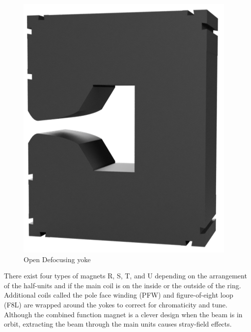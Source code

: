 \documentclass[a4paper,
               biblatex,     %
               keeplastbox,   %
               ]{jacow}
\begin{document}
\begin{figure}[!htb]
\begin{minipage}[b]{0.45\columnwidth}
    \includegraphics*[width=\textwidth]{defocusing}
    \caption{Open Defocusing yoke}
    \label{fig:defocusing}
  \end{minipage}
\end{figure}

There exist four types of magnets R, S, T, and U depending on the arrangement of the half-units and if the main coil is on the inside or the outside of the ring. Additional coils called the pole face winding (PFW) and figure-of-eight loop (F8L) are wrapped around the yokes to correct for chromaticity and tune. Although the combined function magnet is a clever design when the beam is in orbit, extracting the beam through the main units causes stray-field effects. 
\end{document}
